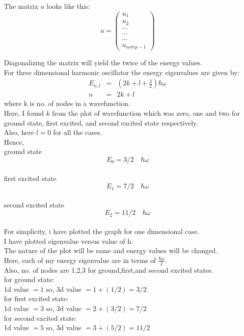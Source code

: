\documentclass[11pt,a4paper,english]{article}
\newcommand{\beqa}{\begin{eqnarray}}
\newcommand{\eeqa}{\end{eqnarray}}
\begin{document}
        The matrix $u$ looks like this:\\
    \begin{displaymath}
    u = 
 	\begin{pmatrix}
 	 	u_{1}  \\
	 	u_{2}  \\
	 	\cdots \\
	 	\cdots \\
	 	\cdots \\
	 	u_{nstep-1}  
 	\end{pmatrix}
    \end{displaymath}        
    
    Diagonalizing the matrix will yield the twice of the energy values.\\
    For three dimensional harmonic oscillator the energy eigenvalues are given by:\\
    \beqa
    E_{n,l}&=& (2k+l+\frac{3}{2}) \hbar \omega\\
    n&=& 2k+l
    \eeqa
    where k is no. of nodes in a wavefunction.\\
    Here, I found $k$ from the plot of wavefunction which was zero, one and two for ground state, first
    excited, and second excited state respectively.\\
    Also, here $l=0$ for all the cases.\\
    Hence,\\
    \clearpage
    ground state $$ E_{0} = 3/2 \quad \hbar \omega $$ \\
    first excited state $$ E_{1} = 7/2 \quad \hbar \omega $$ \\
    second excited state $$ E_{2} = 11/2 \quad \hbar \omega $$ \\
    
    For simplicity, i have plotted the graph for one dimensional case.\\
    I have plotted eigenvalue versus value of h.\\
    The nature of the plot will be same and energy values will be changed.\\
    Here, each of my energy eigenvalue are in terms of $ \frac{\hbar\omega}{2}$.\\
    Also, no. of nodes are 1,2,3 for ground,first,and second excited states.\\
    for ground state:\\
    1d value $=  1 $ so,  3d value $= 1 + (1/2) = 3/2$ \\
    for first excited state:\\
    1d value $=  3 $ so,  3d value $= 2 + (3/2) = 7/2$ \\
    for second excited state:\\
    1d value $=  5 $ so,  3d value $= 3 + (5/2) =11/2$ \\
    
\end{document}
